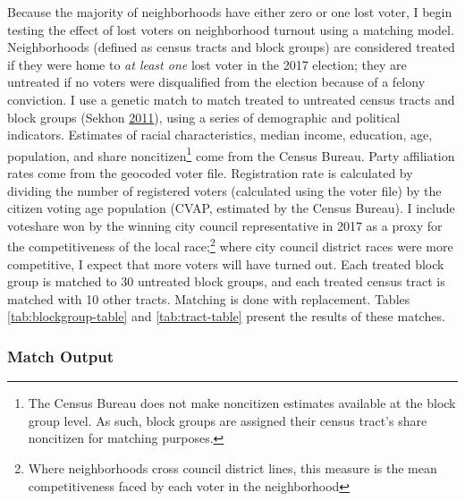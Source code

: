 \documentclass[12pt,]{article}
\let\rmarkdownfootnote\footnote%
\def\footnote{\protect\rmarkdownfootnote}
\begin{document}
Because the majority of neighborhoods have either zero or one lost voter, I begin testing the effect of lost voters on neighborhood turnout using a matching model. Neighborhoods (defined as census tracts and block groups) are considered treated if they were home to \emph{at least one} lost voter in the 2017 election; they are untreated if no voters were disqualified from the election because of a felony conviction. I use a genetic match to match treated to untreated census tracts and block groups (Sekhon \protect\hyperlink{ref-Sekhon2011}{2011}), using a series of demographic and political indicators. Estimates of racial characteristics, median income, education, age, population, and share noncitizen\footnote{The Census Bureau does not make noncitizen estimates available at the block group level. As such, block groups are assigned their census tract's share noncitizen for matching purposes.} come from the Census Bureau. Party affiliation rates come from the geocoded voter file. Registration rate is calculated by dividing the number of registered voters (calculated using the voter file) by the citizen voting age population (CVAP, estimated by the Census Bureau). I include voteshare won by the winning city council representative in 2017 as a proxy for the competitiveness of the local race;\footnote{Where neighborhoods cross council district lines, this measure is the mean competitiveness faced by each voter in the neighborhood} where city council district races were more competitive, I expect that more voters will have turned out. Each treated block group is matched to 30 untreated block groups, and each treated census tract is matched with 10 other tracts. Matching is done with replacement. Tables \ref{tab:blockgroup-table} and \ref{tab:tract-table} present the results of these matches.

\hypertarget{match-output}{%
\subsubsection*{Match Output}\label{match-output}}
\end{document}
